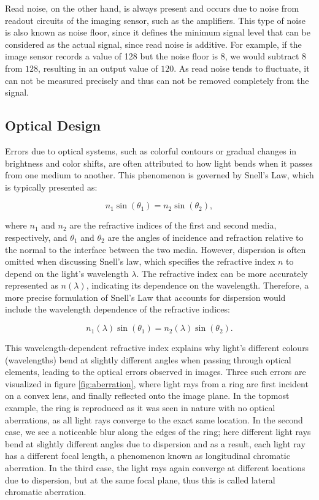 Read noise, on the other hand, is always present and occurs due to noise from readout circuits of the imaging sensor, such as the amplifiers. This type of noise is also known as noise floor, since it defines the minimum signal level that can be considered as the actual signal, since read noise is additive. For example, if the image sensor records a value of 128 but the noise floor is 8, we would subtract $8$ from $128$, resulting in an output value of $120$. As read noise tends to fluctuate, it can not be measured precisely and thus can not be removed completely from the signal. \cite[pp. 62-63, chapter. 3]{rowlands2020physics}

\subsection{Optical Design}

Errors due to optical systems, such as colorful contours or gradual changes in brightness and color shifts, are often attributed to how light bends when it passes from one medium to another. This phenomenon is governed by Snell's Law, which is typically presented as:

\begin{equation}
\label{eq:snell_revised}
n_1 \sin(\theta_1) = n_2 \sin(\theta_2),
\end{equation}

where $n_1$ and $n_2$ are the refractive indices of the first and second media, respectively, and $\theta_1$ and $\theta_2$ are the angles of incidence and refraction relative to the normal to the interface between the two media. However, dispersion is often omitted when discussing Snell's law, which specifies the refractive index $n$ to depend on the light's wavelength $\lambda$. The refractive index can be more accurately represented as $n(\lambda)$, indicating its dependence on the wavelength. Therefore, a more precise formulation of Snell's Law that accounts for dispersion would include the wavelength dependence of the refractive indices:

\begin{equation}
\label{eq:snell_wavelength}
n_1(\lambda) \sin(\theta_1) = n_2(\lambda) \sin(\theta_2).
\end{equation}

This wavelength-dependent refractive index explains why light's different colours (wavelengths) bend at slightly different angles when passing through optical elements, leading to the optical errors observed in images. Three such errors are visualized in figure \ref{fig:aberration}, where light rays from a ring are first incident on a convex lens, and finally reflected onto the image plane. In the topmost example, the ring is reproduced as it was seen in nature with no optical aberrations, as all light rays converge to the exact same location. In the second case, we see a noticeable blur along the edges of the ring; here different light rays bend at slightly different angles due to dispersion and as a result, each light ray has a different focal length, a phenomenon known as longitudinal chromatic aberration. In the third case, the light rays again converge at different locations due to dispersion, but at the same focal plane, thus this is called lateral chromatic aberration.

